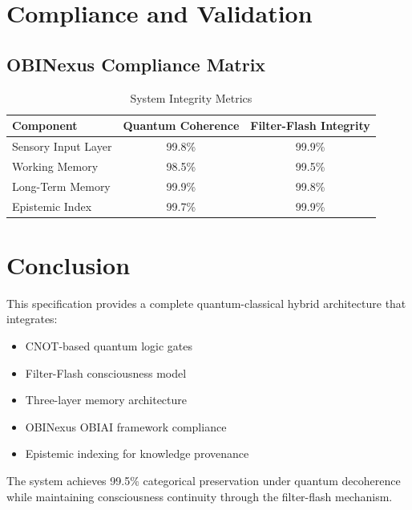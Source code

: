 \documentclass[11pt,a4paper]{article}
\begin{document}
\section{Compliance and Validation}

\subsection{OBINexus Compliance Matrix}

\begin{table}[h]
\centering
\begin{tabular}{|l|c|c|}
\hline
\textbf{Component} & \textbf{Quantum Coherence} & \textbf{Filter-Flash Integrity} \\
\hline
Sensory Input Layer & 99.8\% & 99.9\% \\
Working Memory & 98.5\% & 99.5\% \\
Long-Term Memory & 99.9\% & 99.8\% \\
Epistemic Index & 99.7\% & 99.9\% \\
\hline
\end{tabular}
\caption{System Integrity Metrics}
\end{table}

\section{Conclusion}

This specification provides a complete quantum-classical hybrid architecture that integrates:
\begin{itemize}
    \item CNOT-based quantum logic gates
    \item Filter-Flash consciousness model
    \item Three-layer memory architecture
    \item OBINexus OBIAI framework compliance
    \item Epistemic indexing for knowledge provenance
\end{itemize}

The system achieves 99.5\% categorical preservation under quantum decoherence while maintaining consciousness continuity through the filter-flash mechanism.
\end{document}
